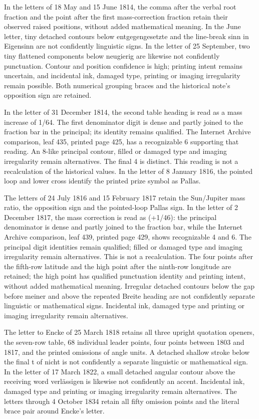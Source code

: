 In the letters of 18 May and 15 June 1814, the comma after the verbal root fraction and the point after the first mass-correction fraction retain their observed raised positions, without added mathematical meaning. In the June letter, tiny detached contours below entgegengesetzte and the line-break sinn in Eigensinn are not confidently linguistic signs. In the letter of 25 September, two tiny flattened components below neugierig are likewise not confidently punctuation. Contour and position confidence is high; printing intent remains uncertain, and incidental ink, damaged type, printing or imaging irregularity remain possible. Both numerical grouping braces and the historical note’s opposition sign are retained.

In the letter of 31 December 1814, the second table heading is read as a mass increase of 1/64. The first denominator digit is dense and partly joined to the fraction bar in the principal; its identity remains qualified. The Internet Archive comparison, leaf 435, printed page 425, has a recognizable 6 supporting that reading. An 8-like principal contour, filled or damaged type and imaging irregularity remain alternatives. The final 4 is distinct. This reading is not a recalculation of the historical values. In the letter of 8 January 1816, the pointed loop and lower cross identify the printed prize symbol as Pallas.

The letters of 24 July 1816 and 15 February 1817 retain the Sun/Jupiter mass ratio, the opposition sign and the pointed-loop Pallas sign. In the letter of 2 December 1817, the mass correction is read as (+1/46): the principal denominator is dense and partly joined to the fraction bar, while the Internet Archive comparison, leaf 439, printed page 429, shows recognizable 4 and 6. The principal digit identities remain qualified; filled or damaged type and imaging irregularity remain alternatives. This is not a recalculation. The four points after the fifth-row latitude and the high point after the ninth-row longitude are retained; the high point has qualified punctuation identity and printing intent, without added mathematical meaning. Irregular detached contours below the gap before meiner and above the repeated Breite heading are not confidently separate linguistic or mathematical signs. Incidental ink, damaged type and printing or imaging irregularity remain alternatives.

The letter to Encke of 25 March 1818 retains all three upright quotation openers, the seven-row table, 68 individual leader points, four points between 1803 and 1817, and the printed omissions of angle units. A detached shallow stroke below the final t of nicht is not confidently a separate linguistic or mathematical sign. In the letter of 17 March 1822, a small detached angular contour above the receiving word verlässigen is likewise not confidently an accent. Incidental ink, damaged type and printing or imaging irregularity remain alternatives. The letters through 4 October 1834 retain all fifty omission points and the literal brace pair around Encke’s letter.

